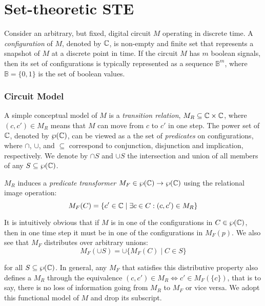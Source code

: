 \section{Set-theoretic STE} \label{sec:set-ste}

Consider an arbitrary, but fixed, digital circuit $M$ operating in discrete time. A \textit{configuration} of $M$, denoted by $\mathbb{C}$, is non-empty and finite set that represents a snapshot of $M$ at a discrete point in time. If the circuit $M$ has $m$ boolean signals, then its set of configurations is typically represented as a sequence $\mathbb{B}^{m}$, where $\mathbb{B} = \{ 0,1 \}$ is the set of boolean values.

\subsubsection{Circuit Model} A simple conceptual model of $M$ is a \textit{transition relation}, $M_{R} \subseteq \mathbb{C} \times \mathbb{C}$, where $(c,c') \in M_{R}$ means that $M$ can move from $c$ to $c'$ in one step\footnotemark. The power set of $\mathbb{C}$, denoted by $\wp(\mathbb{C})$, can be viewed as a the set of \textit{predicates} on configurations, where $\cap$, $\cup$, and $\subseteq$ correspond to conjunction, disjunction and implication, respectively. We denote by $\cap S$ and $\cup S$ the intersection and union of all members of any $S \subseteq \wp(\mathbb{C})$.


$M_{R}$ induces a \textit{predicate transformer} $M_{F} \in \wp(\mathbb{C}) \rightarrow \wp(\mathbb{C})$ using the relational image operation:
%
\begin{equation*}
M_{F}(C) = \{ c' \in \mathbb{C} \mid \exists c \in C : (c,c') \in M_{R} \}
\end{equation*}

\noindent It is intuitively obvious that if $M$ is in one of the configurations in $C \in \wp(\mathbb{C})$, then in one time step it must be in one of the configurations in $M_{F}(p)$. We also see that $M_{F}$ distributes over arbitrary unions:
%
\begin{equation*}
M_{F}(\cup S) = \cup \{ M_{F}(C) \mid C \in S \}
\end{equation*}

\noindent for all $S \subseteq \wp(\mathbb{C})$. In general, any $M_{F}$ that satisfies this distributive property also defines a $M_{R}$ through the equivalence $(c,c') \in M_{R} \iff c' \in M_{F}(\{ c \})$, that is to say, there is no loss of information going from $M_{R}$ to $M_{F}$ or vice versa. We adopt this functional model of $M$ and drop its subscript.

